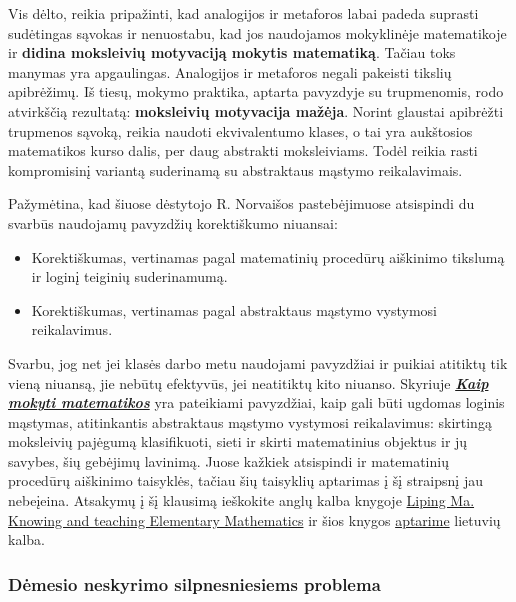 \documentclass{article}
\begin{document}
Vis dėlto, reikia  pripažinti,  kad analogijos ir metaforos labai padeda suprasti sudėtingas sąvokas ir nenuostabu, kad jos naudojamos mokyklinėje matematikoje ir \textbf{didina moksleivių motyvaciją mokytis matematiką}. Tačiau toks manymas yra apgaulingas. Analogijos ir metaforos negali pakeisti tikslių apibrėžimų. Iš tiesų, mokymo praktika, aptarta pavyzdyje su trupmenomis, rodo atvirkščią rezultatą: \textbf{moksleivių motyvacija mažėja}. Norint glaustai apibrėžti trupmenos sąvoką, reikia naudoti ekvivalentumo klases, o tai yra aukštosios matematikos kurso dalis, per daug abstrakti moksleiviams. Todėl reikia rasti kompromisinį variantą suderinamą su abstraktaus mąstymo reikalavimais. 

Pažymėtina, kad šiuose dėstytojo R. Norvaišos pastebėjimuose atsispindi du svarbūs naudojamų pavyzdžių korektiškumo niuansai:
\begin{itemize}
\item Korektiškumas, vertinamas pagal matematinių procedūrų aiškinimo tikslumą ir loginį teiginių suderinamumą.
\item Korektiškumas, vertinamas pagal abstraktaus mąstymo vystymosi reikalavimus.
\end{itemize}

Svarbu, jog net jei klasės darbo metu naudojami pavyzdžiai ir puikiai atitiktų tik vieną niuansą, jie nebūtų efektyvūs, jei neatitiktų kito niuanso. Skyriuje \hyperlink{kaipmokyt}{\textbf{\textit{Kaip mokyti matematikos}}} yra pateikiami pavyzdžiai, kaip gali būti ugdomas loginis mąstymas, atitinkantis abstraktaus mąstymo vystymosi reikalavimus: skirtingą moksleivių pajėgumą klasifikuoti, sieti ir skirti matematinius objektus ir jų savybes, šių gebėjimų lavinimą. Juose kažkiek atsispindi ir matematinių procedūrų aiškinimo taisyklės, tačiau šių taisyklių aptarimas į šį straipsnį jau nebeįeina. Atsakymų į šį klausimą ieškokite anglų kalba knygoje 
\href{https://www.dropbox.com/s/w0m9haikka8trpq/tuxdoc.com_liping-ma-knowing-and-teaching-elementary-mathematics-teachers-understanding-of-fundamental-mathematics-in-china-and-the-united-states.pdf?dl=0}{Liping Ma. Knowing and teaching Elementary Mathematics} ir šios knygos \href{http://norvaisa.lt/matematika/mokykline-matematika/matematikos-mokytoju-seminaras-pakruojyje/}{aptarime} lietuvių kalba.

\subsubsection{Dėmesio neskyrimo silpnesniesiems problema}
\end{document}
